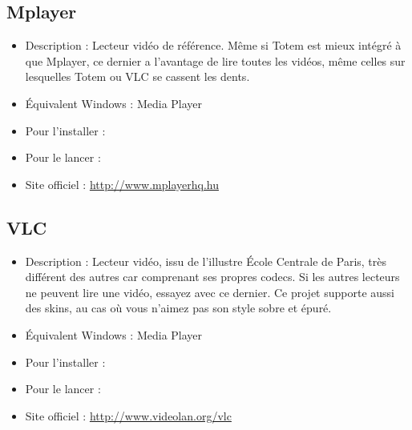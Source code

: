 \subsection{Mplayer}
\begin{itemize}
\begingroup
{}
\item Description : Lecteur vidéo de référence. Même si Totem est mieux intégré à  que Mplayer, ce dernier a l'avantage de lire toutes les vidéos, même celles sur lesquelles Totem ou VLC se cassent les dents.{\par}
\endgroup
\item Équivalent Windows : Media Player{\par}
\item Pour l'installer : 
\item Pour le lancer : 
\item Site officiel : \url{http://www.mplayerhq.hu}{\par}
\end{itemize}
\subsection{VLC}
\label{RefInstallVLC}
\begin{itemize}
\begingroup
{}
\item Description : Lecteur vidéo, issu de l'illustre École Centrale de Paris, très différent des autres car comprenant ses propres codecs. Si les autres lecteurs ne peuvent lire une vidéo, essayez avec ce dernier. Ce projet supporte aussi des skins, au cas où vous n'aimez pas son style sobre et épuré.{\par}
\item Équivalent Windows : Media Player{\par}
\item Pour l'installer : 
\item Pour le lancer : 
\item Site officiel : \url{http://www.videolan.org/vlc}{\par}
\endgroup
\end{itemize}
